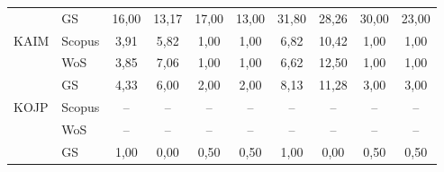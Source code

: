 \begin{table}
\begin{tabular}{llcccccccc}
      & GS     & 16,00   & 13,17 & 17,00 & 13,00 & 31,80   & 28,26 & 30,00 & 23,00 \\[1ex]
 KAIM & Scopus & 3,91    & 5,82  & 1,00  & 1,00  & 6,82    & 10,42 & 1,00  & 1,00  \\
      & WoS    & 3,85    & 7,06  & 1,00  & 1,00  & 6,62    & 12,50 & 1,00  & 1,00  \\
      & GS     & 4,33    & 6,00  & 2,00  & 2,00  & 8,13    & 11,28 & 3,00  & 3,00  \\[1ex]
 KOJP & Scopus & --      & --    & --    & --    & --      & --    & --    & --    \\
      & WoS    & --      & --    & --    & --    & --      & --    & --    & --    \\
      & GS     & 1,00    & 0,00  & 0,50  & 0,50  & 1,00    & 0,00  & 0,50  & 0,50  \\[0.5ex]
  \bottomrule
\end{tabular}
\end{table}

